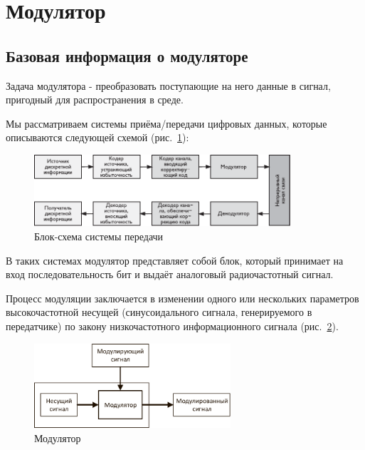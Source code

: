 

\section{Модулятор}

\subsection{Базовая информация о модуляторе}

Задача модулятора - преобразовать поступающие на него данные в сигнал, пригодный для распространения в среде.

Мы рассматриваем системы приёма/передачи цифровых данных, которые описываются следующей схемой (рис.~\ref{system_sch}):

\begin{figure}[h]
\centering
\includegraphics[width = 0.85\textwidth]{system_sch.pdf}
\caption{Блок-схема системы передачи}
\label{system_sch}
\end{figure}

В таких системах модулятор представляет собой блок, который принимает на вход последовательность бит и выдаёт аналоговый радиочастотный сигнал.

Процесс модуляции заключается в изменении одного или нескольких параметров высокочастотной несущей (синусоидального сигнала, генерируемого в передатчике) по закону низкочастотного информационного сигнала (рис.~\ref{simple_mod_sch}).

\begin{figure}[h]
\centering
\includegraphics[width = 0.65\textwidth]{simple_mod_sch.pdf}
\caption{Модулятор}
\label{simple_mod_sch}
\end{figure}

